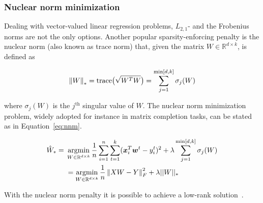     		\subsubsection{Nuclear norm minimization} \label{sec:nucelear_norm_minimization}
			Dealing with vector-valued linear regression problems, $L_{2,1}$- and the Frobenius norms are not the only options. Another popular sparsity-enforcing penalty is the nuclear norm (also known as trace norm) that, given the matrix $W \in \mathbb{R}^{d \times k}$, is defined as
			
			$$
				\left\lVert W\right\rVert_* = \text{trace}\big(\sqrt{W^TW}\big) = \sum_{j=1}^{\min[d, k]} \sigma_j(W)
			$$
			
			where $\sigma_j(W)$ is the $j^{\text{th}}$ singular value of $W$.
			The nuclear norm minimization problem, widely adopted for instance in matrix completion tasks, can be stated as in Equation~\ref{eq:nnm}.
			
			\begin{equation} \label{eq:nnm}
				\begin{aligned}
					\hat W_{*}={} & \mathop{\mathrm{argmin}}\limits_{W \in \mathbb{R}^{d \times k}} \frac{1}{n} \sum_{i=1}^n \sum_{t=1}^k (\bm{x}_i^T\bm{w}^t - y_i^t)^2 + \lambda  \sum_{j=1}^{\min[d, k]} \sigma_j(W) \\
					& =	\mathop{\mathrm{argmin}}\limits_{W \in \mathbb{R}^{d \times k}} \frac{1}{n} \left\lVert XW - Y\right\rVert_F^2 + \lambda ||W||_{*}
				\end{aligned}
			\end{equation}
			
			With the nuclear norm penalty it is possible to achieve a low-rank solution~\cite{candes2009exact}.



